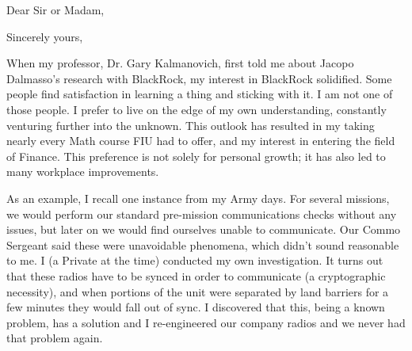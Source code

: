 \documentclass[11pt,a4paper,sans]{moderncv} %
\begin{document}


\date{\today} %
\opening{Dear Sir or Madam,} %
\closing{Sincerely yours,} %

\makelettertitle %
When my professor, Dr. Gary Kalmanovich, first told me about Jacopo Dalmasso's research with BlackRock, my interest in BlackRock solidified. Some people find satisfaction in learning a thing and sticking with it. I am not one of those people. I prefer to live on the edge of my own understanding, constantly venturing further into the unknown. This outlook has resulted in my taking nearly every Math course FIU had to offer, and my interest in entering the field of Finance. This preference is not solely for personal growth; it has also led to many workplace improvements.

As an example, I recall one instance from my Army days. For several missions, we would perform our standard pre-mission communications checks without any issues, but later on we would find ourselves unable to communicate. Our Commo Sergeant said these were unavoidable phenomena, which didn't sound reasonable to me. I (a Private at the time) conducted my own investigation. It turns out that these radios have to be synced in order to communicate (a cryptographic necessity), and when portions of the unit were separated by land barriers for a few minutes they would fall out of sync. I discovered that this, being a known problem, has a solution and I re-engineered our company radios and we never had that problem again.

\end{document}
